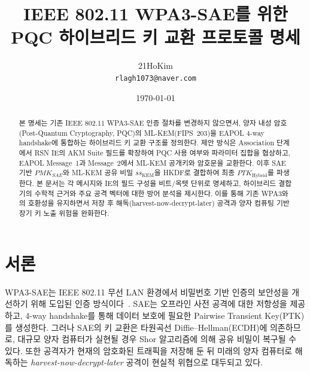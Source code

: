 \documentclass[11pt]{article}
\title{\vspace{-6mm}\bfseries IEEE 802.11 WPA3-SAE를 위한\\ PQC 하이브리드 키 교환 프로토콜 명세}
\author{21HoKim\\ \small \texttt{rlagh1073@naver.com}}
\date{\today}
\newcommand{\ssK}{\ensuremath{ss_{\mathrm{KEM}}}}
\newcommand{\pmkSAE}{\ensuremath{PMK_{SAE}}}
\newcommand{\ptkH}{\ensuremath{PTK_{\mathrm{Hybrid}}}}
\theoremstyle{definition}
\theoremstyle{plain}
\begin{document}
\maketitle

\begin{center}
\end{center}
\vspace{2mm}

\begin{abstract}
\noindent 본 명세는 기존 IEEE 802.11 WPA3-SAE 인증 절차를 변경하지 않으면서,
양자 내성 암호(Post-Quantum Cryptography, PQC)의 ML-KEM(FIPS~203)을 EAPOL
4-way handshake에 통합하는 하이브리드 키 교환 구조를 정의한다. 제안 방식은
Association 단계에서 RSN IE의 AKM Suite 필드를 확장하여 PQC 사용 여부와
파라미터 집합을 협상하고, EAPOL Message~1과 Message~2에서 ML-KEM 공개키와
암호문을 교환한다. 이후 SAE 기반 \pmkSAE{}와 ML-KEM 공유 비밀 \ssK{}을 HKDF로
결합하여 최종 \ptkH{}를 파생한다. 본 문서는 각 메시지와 IE의 필드 구성을
비트/옥텟 단위로 명세하고, 하이브리드 결합기의 수학적 근거와 주요 공격
벡터에 대한 방어 분석을 제시한다. 이를 통해 기존 WPA3와의 호환성을
유지하면서 저장 후 해독(harvest-now-decrypt-later) 공격과 양자 컴퓨팅 기반
장기 키 노출 위험을 완화한다.
\end{abstract}

\tableofcontents
\vspace{4mm}

\section{서론}
WPA3-SAE는 IEEE 802.11 무선 LAN 환경에서 비밀번호 기반 인증의 보안성을
개선하기 위해 도입된 인증 방식이다~\cite{ieee80211,rfc7664}. SAE는 오프라인
사전 공격에 대한 저항성을 제공하고, 4-way handshake를 통해 데이터 보호에
필요한 Pairwise Transient Key(PTK)를 생성한다. 그러나 SAE의 키 교환은
타원곡선 Diffie--Hellman(ECDH)에 의존하므로, 대규모 양자 컴퓨터가 실현될 경우
Shor 알고리즘에 의해 공유 비밀이 복구될 수 있다. 또한 공격자가 현재의
암호화된 트래픽을 저장해 둔 뒤 미래의 양자 컴퓨터로 해독하는
\emph{harvest-now-decrypt-later} 공격이 현실적 위협으로 대두되고 있다.
\end{document}
